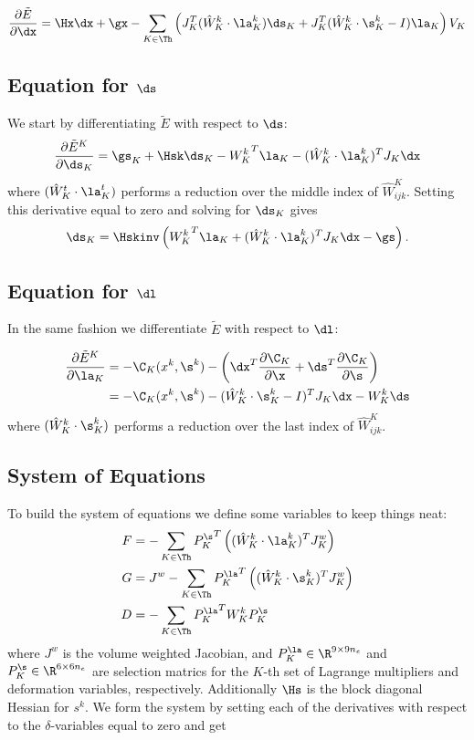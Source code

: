 \begin{equation}
\frac{\partial \tilde{E}}{\partial \dx} = \Hx\dx + \gx 
- \sum_{K \in \Th} \left(
J_K^T(\hat{W}_K^{k}\cdot \la_K^k) \ds_K +
J_K^T(\hat{W}_K^{k}\cdot \s_K^k - I)\la_K
\right)V_K
\end{equation}


\subsection{Equation for $\ds$}
We start by differentiating $\tilde{E}$ with respect to $\ds$:
\begin{equation}
\frac{\partial \tilde{E}^K}{\partial \ds_K} =  \gs_K + \Hsk \ds_K -
{W_K^k}^T \la_K - (\hat{W}_K^{k}\cdot \la_K^k)^T J_K \dx
\end{equation}
where $(\hat{W}_K^{t}\cdot \la_K^t)$ performs a reduction over the middle index of $\hat{W}^K_{ijk}$. Setting this derivative equal to zero and solving for $\ds_K$ gives
\begin{equation}
\ds_K = \Hskinv \left( {W_K^k}^T \la_K + (\hat{W}_K^{k}\cdot \la_K^k)^T J_K \dx - \gs \right).
\end{equation}

\subsection{Equation for $\dl$}
In the same fashion we differentiate $\tilde{E}$ with respect to $\dl$:

\begin{equation}
\begin{split}
\frac{\partial \tilde{E}^K}{\partial \la_K} &= -\C_K (x^k,\s^k)- \left( \dx^T 
  \frac{\partial \C_K }{\partial \x} +  \ds^T \frac{\partial \C_K }{\partial \s} \right) \\
  &= -\C_K (x^k,\s^k) -(\hat{W}_K^{k}\cdot \s_K^k - I)^T J_K \dx - W_K^k \ds\\
\end{split}
\end{equation}
where $(\hat{W}_K^{k}\cdot \s_K^k)$ performs a reduction over the last index of $\hat{W}^K_{ijk}$.


\subsection{System of Equations}
To build the system of equations we define some variables to keep things neat:
\begin{align}
F &= - \sum_{K \in \Th} {P_K^\s}^T \left((\hat{W}_K^{k}\cdot \la_K^k)^T J_K^w \right) \\
G &= J^w - \sum_{K \in \Th} {P_K^\la}^T \left((\hat{W}_K^{k}\cdot \s_K^k)^T J_K^w \right) \\
D &= -\sum_{K \in \Th} {P_K^\la}^T  W_K^k P_K^\s
\end{align}
where $J^w$ is the volume weighted Jacobian, and $P_K^\la \in \R^{9 \times 9n_e}$ and $P_K^\s \in \R^{6 \times 6n_e}$ are selection matrics for the $K$-th set of Lagrange multipliers and deformation variables, respectively. Additionally $\Hs$ is the block diagonal Hessian for $s^k$. We form the system by setting each of the derivatives with respect to the $\delta$-variables equal to zero and get


